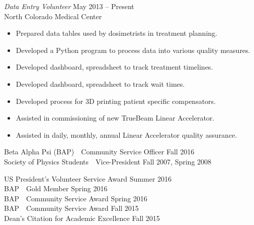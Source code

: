 \documentclass[11pt]{article}
\begin{document}
\begin{description}[leftmargin=!,labelwidth=2cm,align=right]
    {\sl Data Entry Volunteer} \hfill May 2013 -- Present\\North Colorado Medical Center
    \begin{itemize}[rightmargin=2cm,noitemsep]
        \item Prepared data tables used by dosimetrists in treatment planning.
        \item Developed a Python program to process data into various quality measures.
        \item Developed dashboard, spreadsheet to track treatment timelines.
        \item Developed dashboard, spreadsheet to track wait times.
        \item Developed process for 3D printing patient specific compensators.
        \item Assisted in commissioning of new TrueBeam Linear Accelerator.
        \item Assisted in daily, monthly, annual Linear Accelerator quality assurance.
    \end{itemize}

\item[Leadership]
    Beta Alpha Psi (BAP)\ \ Community Service Officer \hfill Fall 2016\\
    Society of Physics Students\ \ Vice-President \hfill Fall 2007, Spring 2008

\item[Awards]
    US President's Volunteer Service Award \hfill Summer 2016\\
    BAP\ \ Gold Member \hfill Spring 2016\\
    BAP\ \ Community Service Award \hfill Spring 2016\\
    BAP\ \ Community Service Award \hfill   Fall 2015\\
    Dean's Citation for Academic Excellence \hfill Fall 2015



\end{description}
\end{document}
